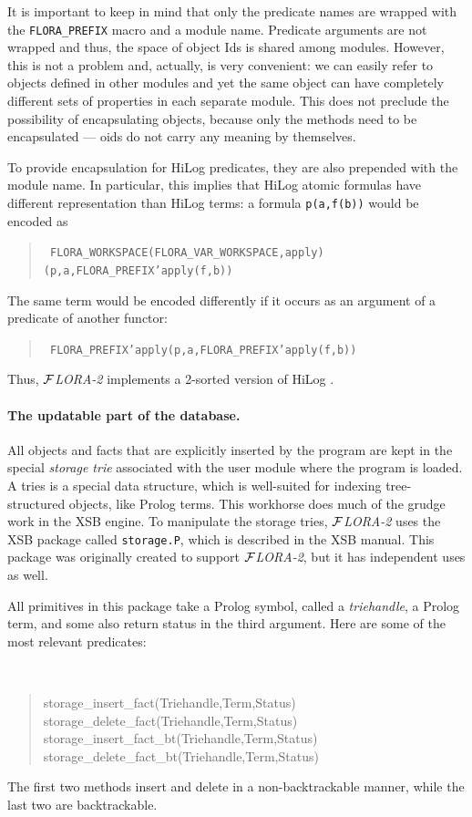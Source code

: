 \documentclass[11pt]{article}
\newcommand{\FLORA}{{\mbox{${\cal F}${\small\it LORA}\rm\emph{-2}}}\xspace}
\begin{document}
It is important to keep in mind that only the predicate names are wrapped
with the {\tt FLORA\_PREFIX} macro and a module name. Predicate arguments
are not wrapped and thus, the space of object Ids is shared among modules.
However, this is not a problem and, actually, is very convenient: we can
easily refer to objects defined in other modules and yet the same object
can have completely different sets of properties in each separate module.
This does not preclude the possibility of encapsulating objects, because
only the methods need to be encapsulated --- oids do not carry any meaning
by themselves.

To provide encapsulation for HiLog predicates, they are also prepended with
the module name. In particular, this implies that HiLog atomic formulas
have different representation than HiLog terms: a formula {\tt p(a,f(b))}
would be encoded as
\begin{quote}
 \tt
 FLORA\_WORKSPACE(FLORA\_VAR\_WORKSPACE,apply)(p,a,FLORA\_PREFIX'apply(f,b))  
\end{quote}
The same term would be encoded differently if it occurs as an argument of a
predicate of another functor:
\begin{quote}
 \tt
 FLORA\_PREFIX'apply(p,a,FLORA\_PREFIX'apply(f,b))    
\end{quote}
Thus, \FLORA implements a 2-sorted version of HiLog \cite{hilog-icdt-95}.

\paragraph{The updatable part of the database.}
All objects and facts that are explicitly inserted by the program are kept
in the special \emph{storage trie} associated with the user module where the
program is loaded. A tries is a special data structure, which is
well-suited for indexing tree-structured objects, like Prolog terms. This
workhorse does much of the grudge work in the XSB engine. To manipulate the
storage tries, \FLORA uses the XSB package called {\tt storage.P}, which is
described in the XSB manual. This package was originally created to support
\FLORA, but it has independent uses as well.

All primitives in this package take a Prolog symbol, called a
\emph{triehandle}, a Prolog term, and some also return status in the third
argument. Here are some of the most relevant predicates:
{\tt
\begin{quote}
  storage\_insert\_fact(Triehandle,Term,Status)\\
  storage\_delete\_fact(Triehandle,Term,Status)\\
  storage\_insert\_fact\_bt(Triehandle,Term,Status)\\
  storage\_delete\_fact\_bt(Triehandle,Term,Status)
\end{quote}
}
\noindent
The first two methods insert and delete in a non-backtrackable manner,
while the last two are backtrackable.
\end{document}

